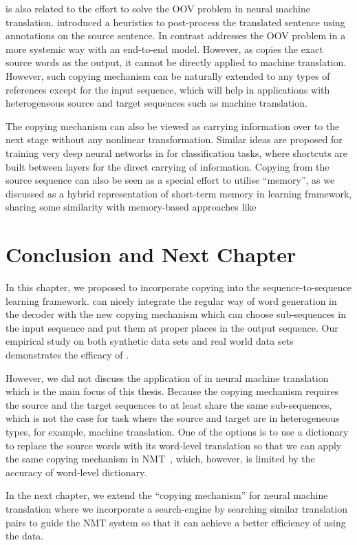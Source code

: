 \copynet is also related to the effort to solve the OOV problem in neural machine translation.  introduced a heuristics to post-process the translated sentence using annotations on the source sentence. In contrast \copynet addresses the OOV problem in a more systemic way with an end-to-end model. However, as \copynet copies the exact source words as the output, it cannot be directly applied to machine translation. However, such copying mechanism can be naturally extended to any types of references except for the input sequence, which will help in applications with heterogeneous source and target sequences such as machine translation.

The copying mechanism can also be viewed as carrying information over to the next stage without any nonlinear transformation.  Similar ideas are proposed for training very deep neural networks in \cite{srivastava2015highway,he2015deep} for classification tasks, where shortcuts are built between layers for the direct carrying of information.  Copying from the source sequence can also be seen as a special effort to utilise ``memory'', as we discussed as a hybrid representation of short-term memory in \sts learning framework, sharing some similarity with memory-based approaches like \cite{weston2014memory,sukhbaatar2015end,graves2014neural}



\section{Conclusion and Next Chapter}
In this chapter, we proposed \copynet to incorporate copying into the sequence-to-sequence learning framework.  \copynet can nicely integrate the regular way of word generation in the decoder with the new copying mechanism which can choose sub-sequences in the input sequence and put them at proper places in the output sequence. Our empirical study on both synthetic data sets and real world data sets demonstrates the efficacy of \copynet. 

However, we did not discuss the application of \copynet in neural machine translation which is the main focus of this thesis. Because the copying mechanism requires the source and the target sequences to at least share the same sub-sequences, which is not the case for  task where the source and target are in  heterogeneous types, for example, machine translation. One of the options is to use a dictionary to replace the source words with its word-level translation so that we can apply the same copying mechanism in NMT~\cite{gulcehre2016pointing}, which, however, is limited by the accuracy of word-level dictionary. 

In the next chapter, we extend the ``copying mechanism'' for neural machine translation where we incorporate a search-engine by searching similar translation pairs to guide the NMT system so that it can achieve a better efficiency of using the data.